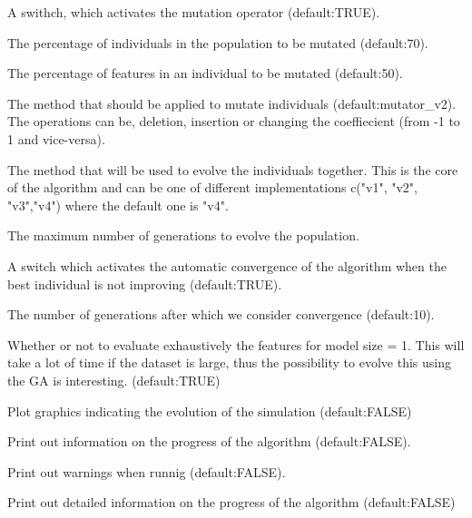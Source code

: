 \documentclass[a4paper]{book}
\begin{document}
\begin{Arguments}
\begin{ldescription}
\item[\code{mutate:}] A swithch, which activates the mutation operator (default:TRUE).

\item[\code{mutate\_size:}] The percentage of individuals in the population to be mutated (default:70).

\item[\code{mutate\_rate:}] The percentage of features in an individual to be mutated (default:50).

\item[\code{mutator:}] The method that should be applied to mutate individuals (default:mutator\_v2).
The operations can be, deletion, insertion or changing the coeffiecient (from -1 to 1
and vice-versa).

\item[\code{evolver:}] The method that will be used to evolve the individuals together.
This is the core of the algorithm and can be one of different implementations 
c("v1", "v2", "v3","v4") where the default one is "v4".

\item[\code{nb\_generations:}] The maximum number of generations to evolve the population.

\item[\code{convergence:}] A switch which activates the automatic convergence of the algorithm
when the best individual is not improving (default:TRUE).

\item[\code{convergence\_steps:}] The number of generations after which we consider 
convergence (default:10).

\item[\code{evolve\_k1:}] Whether or not to evaluate exhaustively the features for 
model size = 1. This will take a lot of time if the dataset is large, thus the
possibility to evolve this using the GA is interesting. (default:TRUE)

\item[\code{plot:}] Plot graphics indicating the evolution of the simulation (default:FALSE)

\item[\code{verbose:}] Print out information on the progress of the algorithm (default:FALSE).

\item[\code{warnings:}] Print out warnings when runnig (default:FALSE).

\item[\code{debug:}] Print out detailed information on the progress of the algorithm 
(default:FALSE)


\end{ldescription}
\end{Arguments}
\end{document}
